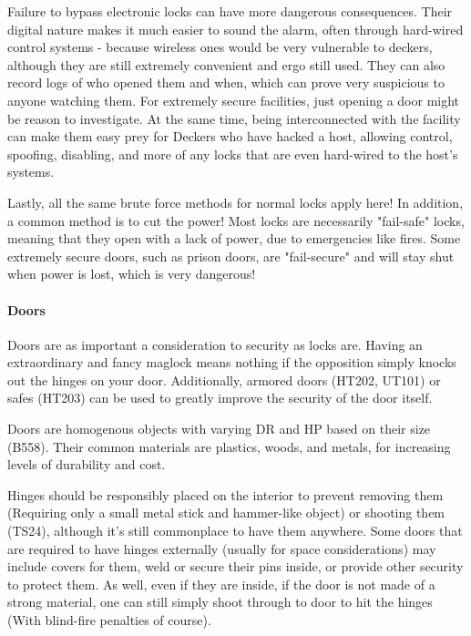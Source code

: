 \begin{multicols*}{2}
	Failure to bypass electronic locks can have more dangerous consequences. Their digital nature makes it much easier to sound the alarm, often through hard-wired control systems - because wireless ones would be very vulnerable to deckers, although they are still extremely convenient and ergo still used. They can also record logs of who opened them and when, which can prove very suspicious to anyone watching them. For extremely secure facilities, just opening a door might be reason to investigate. At the same time, being interconnected with the facility can make them easy prey for Deckers who have hacked a host, allowing control, spoofing, disabling, and more of any locks that are even hard-wired to the host's systems.
	
	Lastly, all the same brute force methods for normal locks apply here! In addition, a common method is to cut the power! Most locks are necessarily "fail-safe" locks, meaning that they open with a lack of power, due to emergencies like fires. Some extremely secure doors, such as prison doors, are "fail-secure" and will stay shut when power is lost, which is very dangerous!
	
	\paragraph{Doors}
	
	Doors are as important a consideration to security as locks are. Having an extraordinary and fancy maglock means nothing if the opposition simply knocks out the hinges on your door. Additionally, armored doors (HT202, UT101) or safes (HT203) can be used to greatly improve the security of the door itself.
	
	Doors are homogenous objects with varying DR and HP based on their size (B558). Their common materials are plastics, woods, and metals, for increasing levels of durability and cost. 
	
	Hinges should be responsibly placed on the interior to prevent removing them (Requiring only a small metal stick and hammer-like object) or shooting them (TS24), although it's still commonplace to have them anywhere. Some doors that are required to have hinges externally (usually for space considerations) may include covers for them, weld or secure their pins inside, or provide other security to protect them. As well, even if they are inside, if the door is not made of a strong material, one can still simply shoot through to door to hit the hinges (With blind-fire penalties of course).
	

\end{multicols*}
